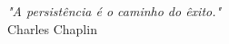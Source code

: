 
\chapter*{}
\vspace{15cm}
\begin{flushright}
	\textit
	{
		"A persistência é o caminho do êxito."
	}\medskip\\ 
	Charles Chaplin
\end{flushright}